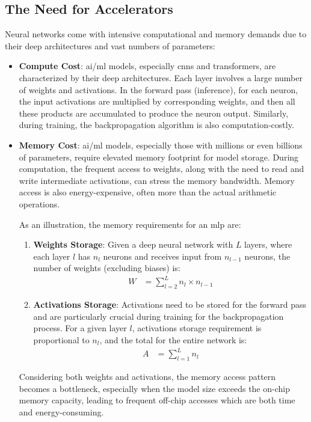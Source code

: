 \subsection{The Need for Accelerators}
Neural networks come with intensive computational and memory demands due to their deep architectures and vast numbers of parameters:

\begin{itemize}
	\item \textbf{Compute Cost}: \gls{ai}/\gls{ml} models, especially \glspl{cnn} and transformers, are characterized by their deep architectures. Each layer involves a large number of weights and activations. In the forward pass (inference), for each neuron, the input activations are multiplied by corresponding weights, and then all these products are accumulated to produce the neuron output. Similarly, during training, the backpropagation algorithm is also computation-costly.
	
	\item \textbf{Memory Cost}: \gls{ai}/\gls{ml} models, especially those with millions or even billions of parameters, require elevated memory footprint for model storage. During computation, the frequent access to weights, along with the need to read and write intermediate activations, can stress the memory bandwidth. Memory access is also energy-expensive, often more than the actual arithmetic operations.
	
	As an illustration, the memory requirements for an \gls{mlp} are:
	\begin{enumerate}
		\item \textbf{Weights Storage}: Given a deep neural network with \(L\) layers, where each layer \(l\) has \(n_l\) neurons and receives input from \(n_{l-1}\) neurons, the number of weights (excluding biases) is:
		\begin{align*}
		W &= \sum_{l=2}^{L} n_l \times n_{l-1}
		\end{align*}
		
		\item \textbf{Activations Storage}: Activations need to be stored for the forward pass and are particularly crucial during training for the backpropagation process. For a given layer \(l\), activations storage requirement is proportional to \(n_l\), and the total for the entire network is:
		\begin{align*}
		A &= \sum_{l=1}^{L} n_l
		\end{align*}
	\end{enumerate}
	Considering both weights and activations, the memory access pattern becomes a bottleneck, especially when the model size exceeds the on-chip memory capacity, leading to frequent off-chip accesses which are both time and energy-consuming.
	

\end{itemize}
